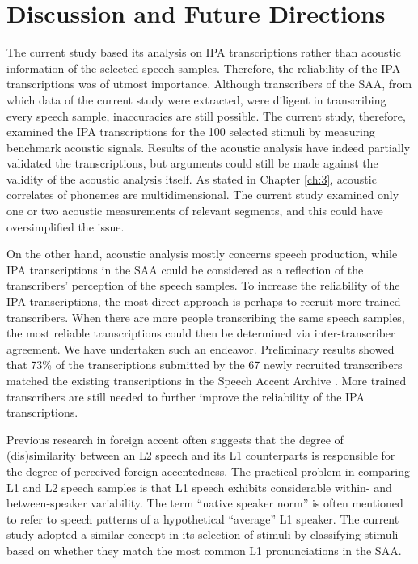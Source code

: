 \section{Discussion and Future Directions}

The current study based its analysis on IPA transcriptions rather than acoustic information of the selected speech samples. Therefore, the reliability of the IPA transcriptions was of utmost importance. Although transcribers of the SAA, from which data of the current study were extracted, were diligent in transcribing every speech sample, inaccuracies are still possible. The current study, therefore, examined the IPA transcriptions for the 100 selected stimuli by measuring benchmark acoustic signals. Results of the acoustic analysis have indeed partially validated the transcriptions, but arguments could still be made against the validity of the acoustic analysis itself. As stated in Chapter \ref{ch:3}, acoustic correlates of phonemes are multidimensional. The current study examined only one or two acoustic measurements of relevant segments, and this could have oversimplified the issue. 

On the other hand, acoustic analysis mostly concerns speech production, while IPA transcriptions in the SAA could be considered as a reflection of the transcribers' perception of the speech samples. To increase the reliability of the IPA transcriptions, the most direct approach is perhaps to recruit more trained transcribers. When there are more people transcribing the same speech samples, the most reliable transcriptions could then be determined via inter-transcriber agreement. We have undertaken such an endeavor. Preliminary results showed that 73\% of the transcriptions submitted by the 67 newly recruited transcribers matched the existing transcriptions in the Speech Accent Archive \citep{Weinberger_2019}. More trained transcribers are still needed to further improve the reliability of the IPA transcriptions.

Previous research in foreign accent often suggests that the degree of (dis)similarity between an L2 speech and its L1 counterparts is responsible for the degree of perceived foreign accentedness. The practical problem in comparing L1 and L2 speech samples is that L1 speech exhibits considerable within- and between-speaker variability. The term “native speaker norm” is often mentioned to refer to speech patterns of a hypothetical “average” L1 speaker. The current study adopted a similar concept in its selection of stimuli by classifying stimuli based on whether they match the most common L1 pronunciations in the SAA.

